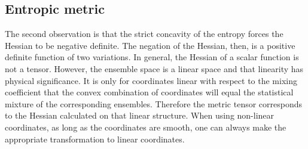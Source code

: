 \subsection{Entropic metric}

The second observation is that the strict concavity of the entropy forces the Hessian to be negative definite. The negation of the Hessian, then, is a positive definite function of two variations. In general, the Hessian of a scalar function is not a tensor. However, the ensemble space is a linear space and that linearity has physical significance. It is only for coordinates linear with respect to the mixing coefficient that the convex combination of coordinates will equal the statistical mixture of the corresponding ensembles. Therefore the metric tensor corresponds to the Hessian calculated on that linear structure. When using non-linear coordinates, as long as the coordinates are smooth, one can always make the appropriate transformation to linear coordinates.

